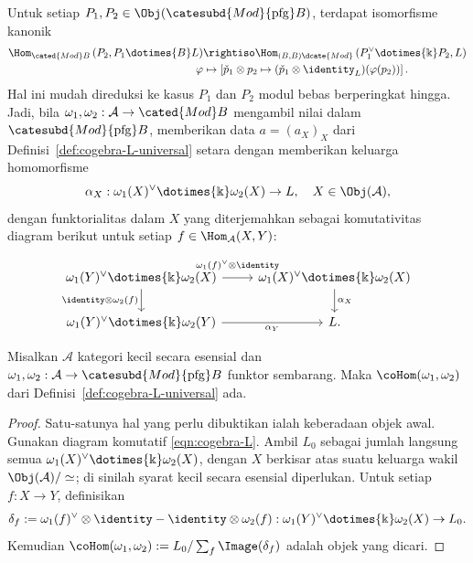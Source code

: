 Untuk setiap
$P_1,P_2\in\Obj(\catesubd{Mod}{\mathrm{pfg}}B)$, terdapat isomorfisme
kanonik
\begin{equation*}\begin{aligned}
	\Hom_{\cated{Mod}B}\left( P_2, P_1 \dotimes{B} L \right) & \rightiso \Hom_{(B, B)\dcate{Mod}}\left( P_1^\vee \dotimes{\Bbbk} P_2, L \right) \\
	\varphi & \mapsto \left[ \check{p}_1 \otimes p_2 \mapsto (\check{p}_1 \otimes \identity_L)(\varphi(p_2)) \right] .
\end{aligned}\end{equation*}
Hal ini mudah direduksi ke kasus $P_1$ dan $P_2$ modul bebas berperingkat
hingga. Jadi, bila
$\omega_1,\omega_2:\mathcal{A}\to\cated{Mod}B$ mengambil nilai dalam
$\catesubd{Mod}{\mathrm{pfg}}B$, memberikan data $a=(a_X)_X$ dari
Definisi~\ref{def:cogebra-L-universal} setara dengan memberikan keluarga
homomorfisme
\[ \alpha_X: \omega_1(X)^\vee \dotimes{\Bbbk} \omega_2(X) \to L, \quad X \in \Obj(\mathcal{A}), \]
dengan funktorialitas dalam $X$ yang diterjemahkan sebagai komutativitas
diagram berikut untuk setiap $f\in\Hom_{\mathcal{A}}(X,Y)$:
\begin{equation}\label{eqn:cogebra-L}\begin{tikzcd}
	\omega_1(Y)^\vee \dotimes{\Bbbk} \omega_2(X) \arrow[r, "{\omega_1(f)^\vee \otimes \identity}" inner sep=0.6em] \arrow[d, "{\identity \otimes \omega_2(f)}"'] & \omega_1(X)^\vee \dotimes{\Bbbk} \omega_2(X) \arrow[d, "{\alpha_X}"] \\
	\omega_1(Y)^\vee \dotimes{\Bbbk} \omega_2(Y) \arrow[r, "{\alpha_Y}"'] & L.
\end{tikzcd}\end{equation}

\begin{proposition}\label{prop:cogebra-L-universal}
	Misalkan $\mathcal{A}$ kategori kecil secara esensial dan
	$\omega_1,\omega_2:\mathcal{A}\to
	\catesubd{Mod}{\mathrm{pfg}}B$ funktor sembarang. Maka
	$\coHom(\omega_1,\omega_2)$ dari
	Definisi~\ref{def:cogebra-L-universal} ada.
\end{proposition}
\begin{proof}
	Satu-satunya hal yang perlu dibuktikan ialah keberadaan objek awal.
	Gunakan diagram komutatif \eqref{eqn:cogebra-L}. Ambil $L_0$ sebagai
	jumlah langsung semua
	$\omega_1(X)^\vee\dotimes{\Bbbk}\omega_2(X)$, dengan $X$ berkisar atas
	suatu keluarga wakil $\Obj(\mathcal{A})/\simeq$; di sinilah syarat kecil
	secara esensial diperlukan. Untuk setiap $f:X\to Y$, definisikan
	\[ \delta_f := \omega_1(f)^\vee \otimes \identity - \identity \otimes \omega_2(f) : \omega_1(Y)^\vee \dotimes{\Bbbk} \omega_2(X) \to L_0. \]
	Kemudian
	$\coHom(\omega_1,\omega_2):=L_0/\sum_f\Image(\delta_f)$ adalah objek
	yang dicari.
\end{proof}

